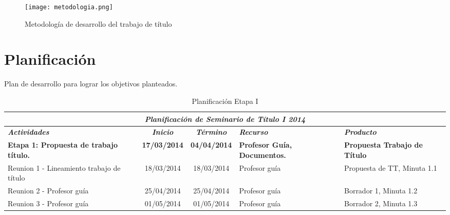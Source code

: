 \documentclass[12pt,letterpaper]{article}
\begin{document}
\begin{figure}[htb]
\begin{center}
\texttt{[image: metodologia.png]}
\end{center}
\caption{Metodolog\'ia de desarrollo del trabajo de t\'itulo}
\end{figure}



\newpage
\clearpage

\section{Planificaci\'on}
\label{plan}

Plan de desarrollo para lograr los objetivos planteados.


\begin{table}[htf]
\begin{tabular}{| p{4cm} | c | c | p{3cm}  | p{2.5cm} |}
\hline

\multicolumn{5}{|c|}{\textbf{\textit{Planificaci\'on de Seminario de T\'itulo I 2014}}} \\ \hline \hline
\textit{\textbf{Actividades}} & 
\textit{\textbf{Inicio}} & 
\textit{\textbf{T\'ermino}} & 
\centering \textit{\textbf{Recurso}} & 
\textit{\textbf{Producto}} \\ \hline \hline
\textbf{Etapa 1: Propuesta de trabajo t\'itulo.} & 
\textbf{17/03/2014} & 
\textbf{04/04/2014} & 
\textbf{Profesor Gu\'ia, Documentos.} & 
\textbf{Propuesta Trabajo de T\'itulo} \\ \hline


Reunion 1 - Lineamiento trabajo de t\'itulo& 
18/03/2014 & 
18/03/2014 &  
Profesor gu\'ia & 
Propuesta de TT, Minuta 1.1 \\ \hline

Reunion 2 - Profesor gu\'ia & 
25/04/2014 & 
25/04/2014 &  
Profesor gu\'ia & 
Borrador 1, Minuta 1.2\\ \hline

Reunion 3 - Profesor gu\'ia & 
01/05/2014 & 
01/05/2014 &  
Profesor gu\'ia & 
Borrador 2, Minuta 1.3 \\ \hline


\hline
\end{tabular}
\caption{Planificaci\'on Etapa I}
\end{table}





\end{document}
